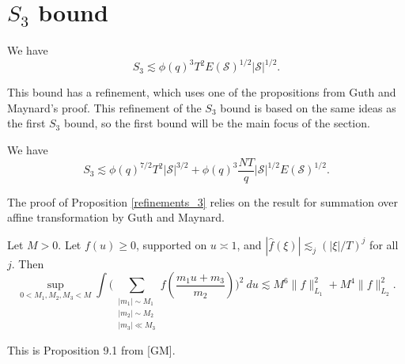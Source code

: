 
\section{$S_3$ bound}
\begin{proposition}\label{s_3bound}
    We have \[
    S_3 \lesssim \phi(q)^3 T^2 E(\mathcal{S})^{1/2} |\mathcal{S}|^{1/2}.
    \]
\end{proposition}
This bound has a refinement, which uses one of the propositions from Guth and Maynard's proof. This refinement of the $S_3$ bound is based on the same ideas as the first $S_3$ bound, so the first bound will be the main focus of the section.
\begin{proposition}[Refinement of $S_3$]
    \label{refinements_3}
    We have \[
    S_3\lesssim \phi(q)^{7/2}T^2|\mathcal{S}|^{3/2}+\phi(q)^{3}\frac{NT}{q}|\mathcal{S}|^{1/2}E(\mathcal{S})^{1/2}.
     \]
\end{proposition}
The proof of Proposition \ref{refinements_3} relies on the result for summation over affine transformation by Guth and Maynard.
\begin{lemma}\label{affinetrans}
    Let $M>0$. Let $f(u)\geq 0$, supported on $u\asymp 1$, and $|\hat{f}(\xi)|\lesssim_j (|\xi|/T)^j$ for all $j$. Then \[
        \sup_{0<M_1,M_2,M_3<M} \int\Bigg( \sum_{\substack{|m_1|\sim M_1\\|m_2|\sim M_2 \\ |m_3|\ll M_3}} f\left(\frac{m_1 u+m_3}{m_2}\right)\Bigg)^2 \ du \lesssim M^6 \|f\|_{L_1}^2+M^4\|f\|_{L_2}^2.
    \] 
\end{lemma}
This is Proposition 9.1 from [GM].


